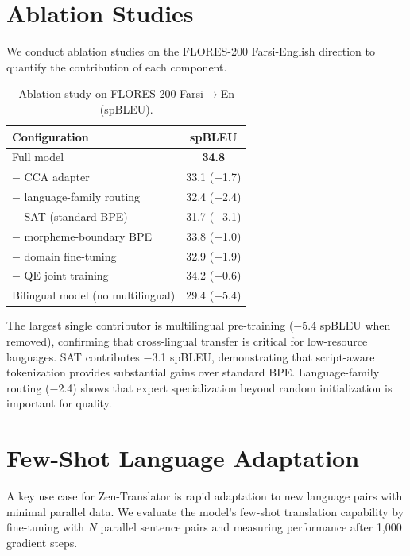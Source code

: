\documentclass[11pt,twocolumn]{article}
\begin{document}
\section{Ablation Studies}
\label{sec:ablation}

We conduct ablation studies on the FLORES-200 Farsi-English direction to
quantify the contribution of each component.

\begin{table}[h]
\centering
\caption{Ablation study on FLORES-200 Farsi$\to$En (spBLEU).}
\label{tab:ablation}
\begin{tabular}{lc}
\toprule
\textbf{Configuration} & \textbf{spBLEU} \\
\midrule
Full model & \textbf{34.8} \\
\quad $-$ CCA adapter & 33.1 ($-$1.7) \\
\quad $-$ language-family routing & 32.4 ($-$2.4) \\
\quad $-$ SAT (standard BPE) & 31.7 ($-$3.1) \\
\quad $-$ morpheme-boundary BPE & 33.8 ($-$1.0) \\
\quad $-$ domain fine-tuning & 32.9 ($-$1.9) \\
\quad $-$ QE joint training & 34.2 ($-$0.6) \\
\quad Bilingual model (no multilingual) & 29.4 ($-$5.4) \\
\bottomrule
\end{tabular}
\end{table}

The largest single contributor is multilingual pre-training ($-$5.4 spBLEU
when removed), confirming that cross-lingual transfer is critical for
low-resource languages. SAT contributes $-$3.1 spBLEU, demonstrating
that script-aware tokenization provides substantial gains over standard BPE.
Language-family routing ($-$2.4) shows that expert specialization beyond
random initialization is important for quality.

\section{Few-Shot Language Adaptation}
\label{sec:fewshot}

A key use case for Zen-Translator is rapid adaptation to new language pairs
with minimal parallel data. We evaluate the model's few-shot translation
capability by fine-tuning with $N$ parallel sentence pairs and measuring
performance after 1,000 gradient steps.
\end{document}

